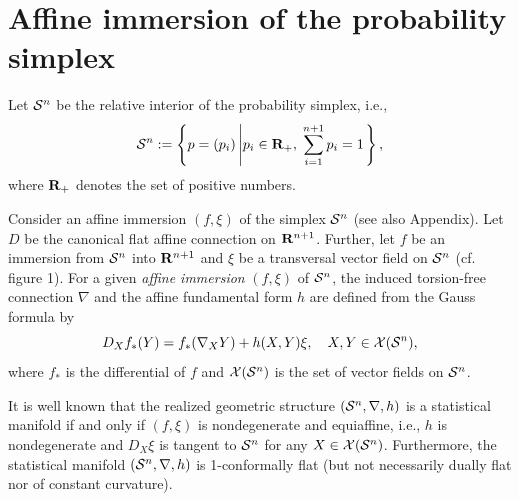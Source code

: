 \documentclass{llncs}
\begin{document}


%

\section{Affine immersion of the probability simplex}
Let ${\cal S}^n$ be the relative interior of 
the probability simplex, i.e.,
\[
	{\cal S}^n :=\left\{p=(p_i) \left| 
		p_i \in {\bf R}_+, \; \sum_{i=1}^{n+1} p_i =1 \right.  \right\},
\]
where ${\bf R}_+$ denotes the set of positive numbers.

Consider an affine immersion \cite{NS}
$(f, \xi)$ of the simplex ${\cal S}^n$ (see also Appendix).
Let $D$ be the canonical flat affine connection on ${\bf R}^{n+1}$.
Further, let 
$f$ be an immersion from ${\cal S}^n$ into ${\bf R}^{n+1}$ and 
$\xi$ be a transversal vector field on ${\cal S}^n$ (cf. figure 1).
For a given {\em affine immersion} $(f, \xi)$ of ${\cal S}^n$,
the induced torsion-free connection $\nabla$ 
and the affine fundamental form $h$ 
are defined from the Gauss formula by
\begin{equation}
	D_X f_*(Y)= f_*(\nabla_X Y)+h(X,Y)\xi,
		\quad X,Y \in {\cal X}({\cal S}^n),
\end{equation}
where $f_*$ is the differential of $f$ and 
${\cal X}({\cal S}^n)$ is the set of vector fields on ${\cal S}^n$.

It is well known \cite{Kurose94,NS} that the realized geometric structure 
$({\cal S}^n,\nabla,h)$ is a statistical manifold if and only if 
$(f, \xi)$ is nondegenerate and equiaffine, i.e., 
$h$ is nondegenerate and $D_X \xi$ is tangent to ${\cal S}^n$ for 
any $X \in {\cal X}({\cal S}^n)$.
Furthermore, the statistical manifold $({\cal S}^n,\nabla,h)$ is 
1-conformally flat \cite{Kurose94} 
(but not necessarily dually flat nor of constant curvature).
\end{document}
